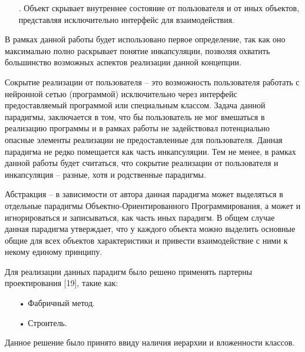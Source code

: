 {\begin{itemize}[leftmargin=2.15cm, labelwidth=0.65cm, labelsep=0.0cm]
	\item[\theitemcntr. ] Объект скрывает внутреннее состояние от пользователя и от иных объектов, представляя исключительно интерфейс для взаимодействия.
	\addtocounter{itemcntr}{1}
	
	\setcounter{itemcntr}{1}
\end{itemize}  

\par \redline В рамках данной работы будет использовано первое определение, так как оно максимально полно раскрывает понятие инкапсуляции, позволяя охватить большинство возможных аспектов реализации данной концепции.   

\par \redline Сокрытие реализации от пользователя {--} это возможность пользователя работать с нейронной сетью (программой) исключительно через интерфейс предоставляемый программой или специальным классом. Задача данной парадигмы, заключается в том, что бы пользователь не мог вмешаться в реализацию программы и в рамках работы не задействовал потенциально опасные элементы реализации не предоставленные для пользователя. Данная парадигма не редко помещается как часть инкапсуляции. Тем не менее, в рамках данной работы будет считаться, что сокрытие реализации от пользователя и инкапсуляция {--} разные, хотя и родственные парадигмы.

\par \redline Абстракция {--} в зависимости от автора данная парадигма может выделяться в отдельные парадигмы Объектно-Ориентированного Программирования, а может и игнорироваться и записываться, как часть иных парадигм. В общем случае данная парадигма утверждает, что у каждого объекта можно выделить основные общие для всех объектов характеристики и привести взаимодействие с ними к некому единому принципу.

\par \redline  Для реализации данных парадигм было решено применять партерны проектирования [19], такие как:

\begin{itemize}[leftmargin=2.15cm, labelwidth=0.65cm, labelsep=0.0cm] 
	
	\item[•] Фабричный метод.
	
	\item[•] Строитель. 
	
\end{itemize}

\par \redline  Данное решение было принято ввиду наличия иерархии и вложенности классов.

}
